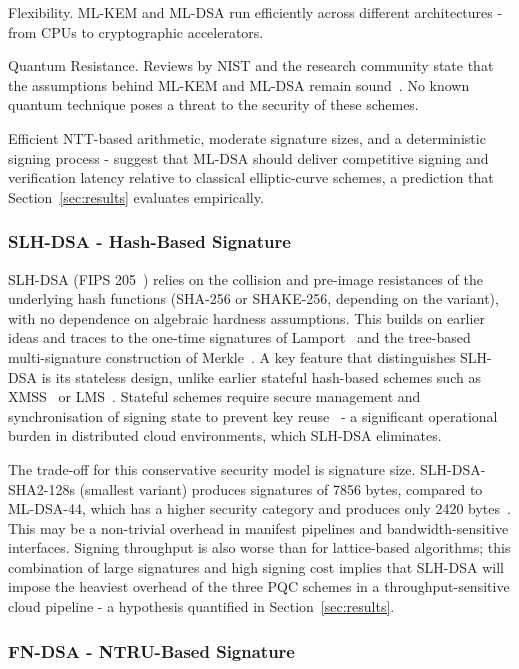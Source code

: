 \documentclass[12pt,a4paper]{article}
\begin{document}
Flexibility. ML-KEM and ML-DSA run efficiently across different architectures - from CPUs to cryptographic accelerators.

Quantum Resistance. Reviews by NIST and the research community state that the assumptions behind ML-KEM and ML-DSA remain sound~\cite{nist-fips-203-2024,nist-fips-204-2024}. No known quantum technique poses a threat to the security of these schemes.

Efficient NTT-based arithmetic, moderate signature sizes, and a deterministic signing process - suggest that ML-DSA should deliver competitive signing and verification latency relative to classical elliptic-curve schemes, a prediction that Section~\ref{sec:results} evaluates empirically.

\subsubsection{SLH-DSA - Hash-Based Signature}

SLH-DSA (FIPS 205~\cite{nist-fips-205-2024}) relies on the collision and pre-image resistances of the underlying hash functions (SHA-256 or SHAKE-256, depending on the variant), with no dependence on algebraic hardness assumptions. This builds on earlier ideas and traces to the one-time signatures of Lamport~\cite{lamport1979} and the tree-based multi-signature construction of Merkle~\cite{merkle1989}. A key feature that distinguishes SLH-DSA is its stateless design, unlike earlier stateful hash-based schemes such as XMSS~\cite{rfc8391-xmss} or LMS~\cite{rfc8554-lms}. Stateful schemes require secure management and synchronisation of signing state to prevent key reuse~\cite{nist-sp800-208-2020} - a significant operational burden in distributed cloud environments, which SLH-DSA eliminates.

The trade-off for this conservative security model is signature size. SLH-DSA-SHA2-128s (smallest variant) produces signatures of 7856 bytes, compared to ML-DSA-44, which has a higher security category and produces only 2420 bytes~\cite{nist-fips-205-2024,nist-fips-204-2024}. This may be a non-trivial overhead in manifest pipelines and bandwidth-sensitive interfaces. Signing throughput is also worse than for lattice-based algorithms; this combination of large signatures and high signing cost implies that SLH-DSA will impose the heaviest overhead of the three PQC schemes in a throughput-sensitive cloud pipeline - a hypothesis quantified in Section~\ref{sec:results}.

\subsubsection{FN-DSA - NTRU-Based Signature}
\end{document}
